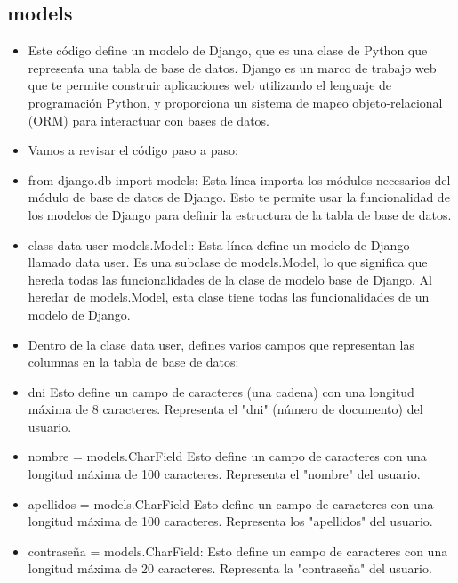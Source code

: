 \documentclass{article}
\begin{document}

	\subsection{models}
	\begin{itemize}
		
		\item Este código define un modelo de Django, que es una clase de Python que representa una tabla de base de datos. Django es un marco de trabajo web que te permite construir aplicaciones web utilizando el lenguaje de programación Python, y proporciona un sistema de mapeo objeto-relacional (ORM) para interactuar con bases de datos.

		\item Vamos a revisar el código paso a paso:
		
		\item from django.db import models: Esta línea importa los módulos necesarios del módulo de base de datos de Django. Esto te permite usar la funcionalidad de los modelos de Django para definir la estructura de la tabla de base de datos.
		
		\item class data user models.Model:: Esta línea define un modelo de Django llamado data user. Es una subclase de models.Model, lo que significa que hereda todas las funcionalidades de la clase de modelo base de Django. Al heredar de models.Model, esta clase tiene todas las funcionalidades de un modelo de Django.
		

		\item Dentro de la clase data user, defines varios campos que representan las columnas en la tabla de base de datos:
		
		\item dni  Esto define un campo de caracteres (una cadena) con una longitud máxima de 8 caracteres. Representa el "dni" (número de documento) del usuario.
		
		\item nombre = models.CharField Esto define un campo de caracteres con una longitud máxima de 100 caracteres. Representa el "nombre" del usuario.
		
		\item apellidos = models.CharField Esto define un campo de caracteres con una longitud máxima de 100 caracteres. Representa los "apellidos" del usuario.
		
		\item contraseña = models.CharField: Esto define un campo de caracteres con una longitud máxima de 20 caracteres. Representa la "contraseña" del usuario.
		

\end{itemize}
\end{document}
